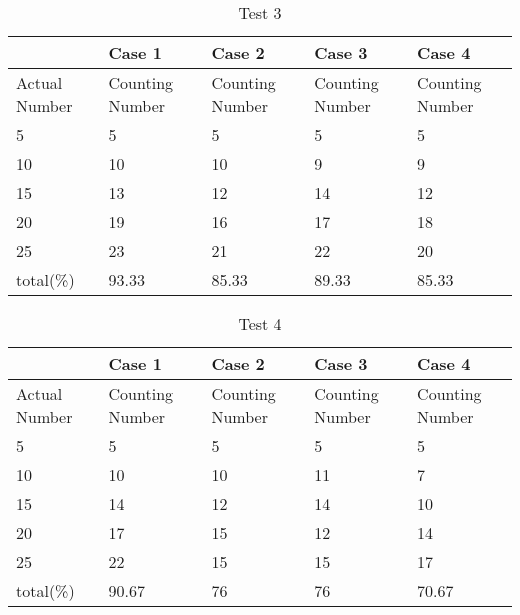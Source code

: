 \begin{table}[t]
	\centering
	\begin{tabular}{|p{1.5cm}|p{1.5cm}|p{1.5cm}|p{1.5cm}|p{1.5cm}|}
		\hline
		& Case 1 & Case 2 & Case 3 & Case 4\\
		\hline
		Actual Number & Counting Number & Counting Number & Counting Number & Counting Number\\
		\hline
	5	& 	5	&  	5	&  	5	& 5		\\
	10	& 	10 	& 	10	& 	9	& 9		\\
	15	& 	13	&	12	& 	14	& 12	\\
	20	& 	19	& 	16	& 	17	& 18	\\
	25	& 	23	& 	21	& 	22	& 20	\\
		total(\%)& 	93.33	&	85.33	&	89.33	& 85.33	\\
		\hline
	\end{tabular}
	\caption{Test 3} \label{teb:test803}
\end{table}
\begin{table}[t]
	\centering
	\begin{tabular}{|p{1.5cm}|p{1.5cm}|p{1.5cm}|p{1.5cm}|p{1.5cm}|}
		\hline
		& Case 1 & Case 2 & Case 3 & Case 4\\
		\hline
		Actual Number & Counting Number & Counting Number & Counting Number & Counting Number\\
		\hline
	5	& 	5	&  5	&  	5	& 5	\\
	10	& 	10	& 	10	& 	11	& 7	\\
	15	& 	14	&	12	& 	14	& 10	\\
	20	& 	17	& 	15	& 	12	& 14	\\
	25	& 	22	& 	15	& 	15	& 17	\\
		total(\%)& 	90.67	&	76	&	76	& 70.67	\\
		\hline
	\end{tabular}
	\caption{Test 4} \label{teb:test804}
\end{table}

